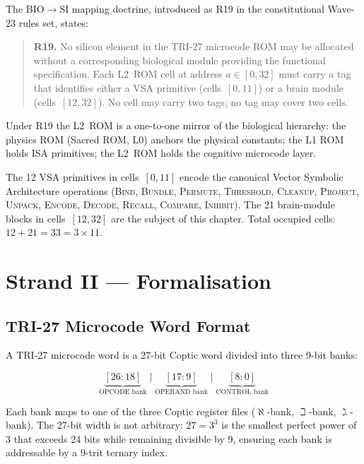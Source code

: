 The BIO$\to$SI mapping doctrine, introduced as R19 in the
constitutional Wave-23 rules set, states:

\begin{quote}
\textbf{R19.}
No silicon element in the TRI-27 microcode ROM may be allocated
without a corresponding biological module providing the functional
specification.  Each L2~ROM cell at address $a \in [0,32]$ must
carry a tag that identifies either a VSA primitive
(cells~$[0,11]$) or a brain module (cells~$[12,32]$).
No cell may carry two tags; no tag may cover two cells.
\end{quote}

Under R19 the L2~ROM is a one-to-one mirror of the biological
hierarchy: the physics ROM (Sacred ROM, L0) anchors the physical
constants; the L1 ROM holds ISA primitives; the L2~ROM holds the
cognitive microcode layer.

The 12 VSA primitives in cells~$[0,11]$ encode the canonical
Vector Symbolic Architecture operations
(\textsc{Bind}, \textsc{Bundle}, \textsc{Permute},
\textsc{Threshold}, \textsc{Cleanup}, \textsc{Project},
\textsc{Unpack}, \textsc{Encode}, \textsc{Decode},
\textsc{Recall}, \textsc{Compare}, \textsc{Inhibit}).
The 21 brain-module blocks in cells~$[12,32]$ are the subject of
this chapter.
Total occupied cells: $12 + 21 = 33 = 3 \times 11$.

\section{Strand II --- Formalisation}
\label{sec:73:strand-ii}

\subsection{TRI-27 Microcode Word Format}
\label{sec:73:word-format}

A TRI-27 microcode word is a 27-bit Coptic word divided into
three 9-bit banks:

\[
  \underbrace{[26:18]}_{\text{OPCODE bank}}
  \;\big|\;
  \underbrace{[17:9]}_{\text{OPERAND bank}}
  \;\big|\;
  \underbrace{[8:0]}_{\text{CONTROL bank}}
\]

Each bank maps to one of the three Coptic register files
($\aleph$-bank, $\beth$-bank, $\gimel$-bank).
The 27-bit width is not arbitrary: $27 = 3^{3}$ is the smallest
perfect power of 3 that exceeds 24 bits while remaining
divisible by 9, ensuring each bank is addressable by a 9-trit
ternary index.

